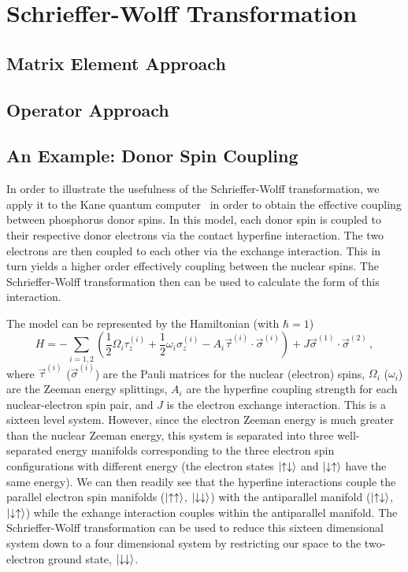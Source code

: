 \section{Schrieffer-Wolff Transformation}\label{SEC:sw_trans}

\subsection{Matrix Element Approach}
\subsection{Operator Approach}
\subsection{An Example: Donor Spin Coupling}

In order to illustrate the usefulness of the Schrieffer-Wolff transformation, we apply it to the Kane quantum computer~\cite{kane_1998} in order to obtain the effective coupling between phosphorus donor spins.
In this model, each donor spin is coupled to their respective donor electrons via the contact hyperfine interaction.
The two electrons are then coupled to each other via the exchange interaction.
This in turn yields a higher order effectively coupling between the nuclear spins.
The Schrieffer-Wolff transformation then can be used to calculate the form of this interaction.

The model can be represented by the Hamiltonian (with $\hbar=1$)
\begin{equation}
    H = -\sum_{i=1,2} \left(\frac{1}{2}\Omega_i \tau_{z}^{(i)} + \frac{1}{2}\omega_i \sigma_z^{(i)} - A_i \vec{\tau}^{(i)}\cdot \vec{\sigma}^{(i)}\right) + J\vec{\sigma}^{(1)}\cdot\vec{\sigma}^{(2)} \,,
\end{equation}
where $\vec{\tau}^{(i)}$ ($\vec{\sigma}^{(i)}$) are the Pauli matrices for the nuclear (electron) spins, $\Omega_i$ ($\omega_{i}$) are the Zeeman energy splittings, $A_i$ are the hyperfine coupling strength for each nuclear-electron spin pair, and $J$ is the electron exchange interaction.
This is a sixteen level system.
However, since the electron Zeeman energy is much greater than the nuclear Zeeman energy, this system is separated into three well-separated energy manifolds corresponding to the three electron spin configurations with different energy (the electron states $\ket{\uparrow\downarrow}$ and $\ket{\downarrow\uparrow}$ have the same energy).
We can then readily see that the hyperfine interactions couple the parallel electron spin manifolds ($\ket{\uparrow\uparrow}$, $\ket{\downarrow\downarrow}$) with the antiparallel manifold ($\ket{\uparrow\downarrow}$, $\ket{\downarrow\uparrow}$) while the exhange interaction couples within the antiparallel manifold.
The Schrieffer-Wolff transformation can be used to reduce this sixteen dimensional system down to a four dimensional system by restricting our space to the two-electron ground state, $\ket{\downarrow\downarrow}$.

